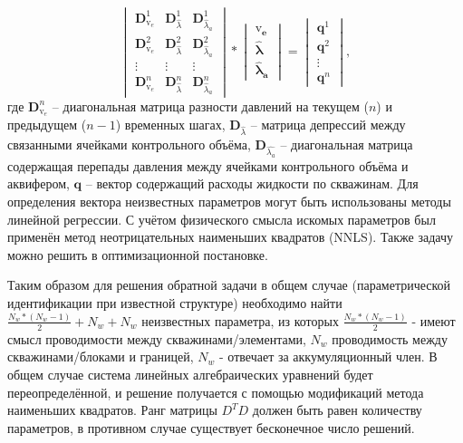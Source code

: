 \documentclass[14pt]{article}
\begin{document}
\begin{equation} \label{m3x1}
	\begin{vmatrix}
		\boldsymbol{D}_{\mathrm{v}_e}^1& \boldsymbol{D}_{\hat{\lambda}}^1& \boldsymbol{D}_{\hat{\lambda}_a}^1\\
		\boldsymbol{D}_{\mathrm{v}_e}^2& \boldsymbol{D}_{\hat{\lambda}}^2& \boldsymbol{D}_{\hat{\lambda}_a}^2 \\
		\vdots&\vdots&\vdots\\
		\boldsymbol{D}_{\mathrm{v}_e}^n& \boldsymbol{D}_{\hat{\lambda}}^n& \boldsymbol{D}_{\hat{\lambda}_a}^n
	\end{vmatrix}
	* 
	\begin{vmatrix}
\boldsymbol{\mathrm{v}_e} \\ \boldsymbol{\hat{\lambda}} \\ \boldsymbol{\hat{\lambda}_a}
	\end{vmatrix}
	=
	\begin{vmatrix}
		\boldsymbol{q}^1\\
		\boldsymbol{q}^2\\
		\vdots\\
		\boldsymbol{q}^n
	\end{vmatrix},
\end{equation}
где $\boldsymbol{D}_{\mathrm{v}_e}^n$ -- диагональная матрица  разности давлений на текущем ($n$) и предыдущем ($n-1$) временных шагах, $\boldsymbol{D}_{\hat{\lambda}}$ -- матрица депрессий между связанными ячейками контрольного объёма, $\boldsymbol{D}_{\hat{\lambda_a}}$ -- диагональная матрица содержащая перепады давления между ячейками контрольного объёма и аквифером, $\boldsymbol{q}$ -- вектор содержащий расходы жидкости по скважинам.
Для определения вектора неизвестных параметров могут быть использованы методы линейной регрессии. С учётом физического смысла искомых параметров был применён метод неотрицательных наименьших квадратов (NNLS). Также задачу можно решить в оптимизационной постановке.

Таким образом для решения обратной задачи в общем случае (параметрической идентификации при известной структуре) необходимо найти $\frac{N_w*(N_w-1)}{2} + N_w + N_w$ неизвестных параметра, из которых $\frac{N_w*(N_w-1)}{2}$ - имеют смысл проводимости между скважинами/элементами, $N_w$ проводимость между скважинами/блоками и границей, $N_w$ - отвечает за аккумуляционный член. 
В общем случае система линейных алгебраических уравнений будет переопределённой, и решение получается с помощью модификаций метода наименьших квадратов. Ранг матрицы $D^TD$ должен быть равен количеству параметров, в противном случае существует бесконечное число решений.
\end{document}
